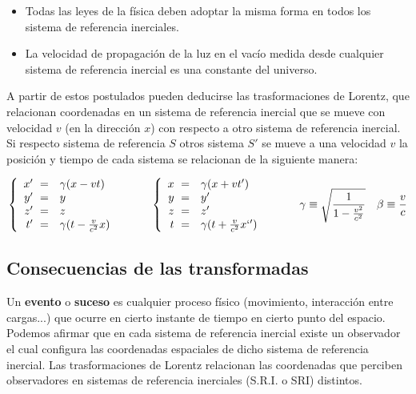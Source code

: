 \documentclass[12pt,a4paper]{article}
\newcommand{\tquad}{\quad \quad \quad}
\numberwithin{equation}{section}
\numberwithin{figure}{section}
\begin{document}
\begin{itemize}
\item Todas las leyes de la física deben adoptar la misma forma en  todos los sistema de referencia inerciales.
\item La velocidad de propagación de la luz en el vacío medida desde cualquier sistema de referencia inercial es una constante del universo.
\end{itemize}

A partir de estos postulados pueden deducirse las trasformaciones de Lorentz, que relacionan coordenadas en un sistema de referencia inercial que se mueve con velocidad $v$  (en la dirección $x$) con respecto a otro sistema de referencia inercial. Si respecto sistema de referencia $S$ otros sistema $S'$  se mueve a una velocidad $v$ la posición y tiempo de cada sistema se relacionan de la siguiente manera:

\begin{equation}
\left\lbrace
\begin{array}{rl}
x' \ = & \gamma (x - vt) \\
y' \ = & y \\
z' \ = & z \\
t' \ = & \gamma (t-\frac{v}{c^2} x )
\end{array} \right.
\tquad 
\left\lbrace
\begin{array}{rl}
x \ = & \gamma (x + vt') \\
y \ = & y ' \\
z \ = & z ' \\
t \ = & \gamma (t+\frac{v}{c^2} x`' )
\end{array} \right. \tquad
\gamma \equiv \sqrt{\dfrac{1}{1-\frac{v^2}{c^2}}} \quad \beta \equiv \dfrac{v}{c}
\end{equation}

\subsection{Consecuencias de las transformadas}

Un \textbf{evento} o \textbf{suceso} es cualquier proceso físico (movimiento, interacción entre cargas...) que ocurre en cierto instante de tiempo en cierto punto del espacio. Podemos afirmar que en cada sistema de referencia inercial existe un observador el cual configura las coordenadas espaciales de dicho sistema de referencia inercial. Las trasformaciones de Lorentz relacionan las coordenadas que perciben observadores en sistemas de referencia inerciales (S.R.I. o SRI) distintos. \\
\end{document}
